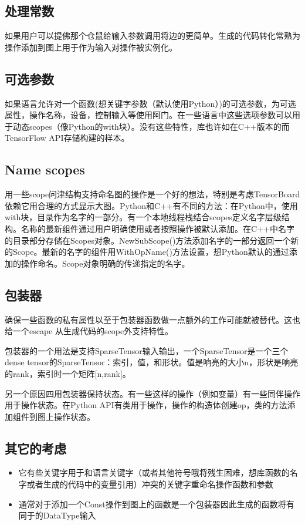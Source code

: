 \subsection{处理常数}
如果用户可以提佛那个仓鼠给输入参数调用将边的更简单。生成的代码转化常熟为操作添加到图上用于作为输入对操作被实例化。
\subsection{可选参数}
如果语言允许对一个函数(想关键字参数（默认使用Python）)的可选参数，为可选属性，操作名称，设备，控制输入等使用阿门。在一些语言中这些选项参数可以用于动态scopes（像Python的with块）。没有这些特性，库也许如在C++版本的而TensorFlow API存储构建的样本。
\subsection{Name scopes}
用一些scope问津结构支持命名图的操作是一个好的想法，特别是考虑TensorBoard依赖它用合理的方式显示大图。Python和C++有不同的方法：在Python中，使用with块，目录作为名字的一部分。有一个本地线程栈结合scopes定义名字层级结构。名称的最新组件通过用户明确使用或者按照操作被默认添加。在C++中名字的目录部分存储在Scopes对象。NewSubScope()方法添加名字的一部分返回一个新的Scope。最新的名字的组件用WithOpName()方法设置，想Python默认的通过添加的操作命名。Scope对象明确的传递指定的名字。
\subsection{包装器}
确保一些函数的私有属性以至于包装器函数做一点额外的工作可能就被替代。这也给一个escape 从生成代码的scope外支持特性。

包装器的一个用法是支持SparseTensor输入输出，一个SparseTensor是一个三个dense tensor的SparseTensor：索引，值，和形状。值是响亮的大小n，形状是响亮的rank，索引时一个矩阵[n,rank]。

另一个原因四用包装器保持状态。有一些这样的操作（例如变量）有一些同伴操作用于操作状态。在Python API有类用于操作，操作的构造体创建op，类的方法添加组件到图上操作状态。
\subsection{其它的考虑}
\begin{itemize}
		\item 它有些关键字用于和语言关键字（或者其他符号哦将残生困难，想库函数的名字或者生成的代码中的变量引用）冲突的关键字重命名操作函数和参数
		\item 通常对于添加一个Const操作到图上的函数是一个包装器因此生成的函数将有同于的DataType输入
\end{itemize}
